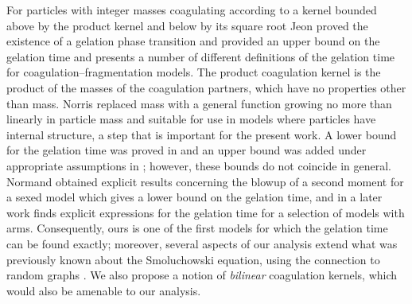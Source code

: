 For particles with integer masses coagulating according to a kernel bounded above by the product kernel and below by its square root Jeon \cite{J98} proved the existence of a gelation phase transition and provided an upper bound on the gelation time and presents a number of different definitions of the gelation time for coagulation--fragmentation models.
The product coagulation kernel is the product of the masses of the coagulation partners, which have no properties other than mass.
Norris \cite{N99,N00} replaced mass with a general function growing no more than linearly in particle mass and suitable for use in models where particles have internal structure, a step that is important for the present work.
A lower bound for the gelation time was proved in \cite{N99} and an upper bound was added under appropriate assumptions in \cite{N00}; however, these bounds do not coincide in general. Normand \cite{Nm09} obtained explicit results concerning the blowup of a second moment for a sexed model which gives a lower bound on the gelation time, and in a later work \cite{Nm11} finds explicit expressions for the gelation time for a selection of models with arms.  Consequently, ours is one of the first models for which the gelation time can be found exactly; moreover, several aspects of our analysis extend what was previously known about the Smoluchowski equation, using the connection to random graphs \cite{BJR07}. We also propose a notion of \emph{bilinear} coagulation kernels, which would also be amenable to our analysis.


